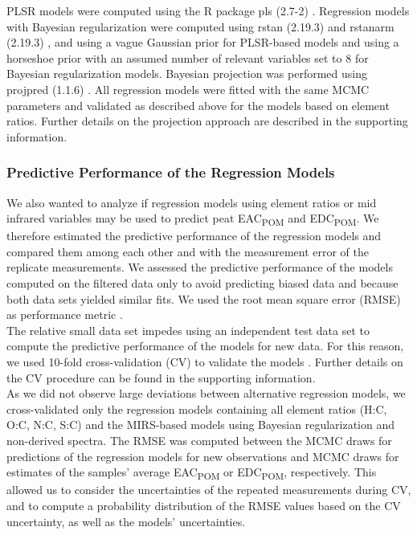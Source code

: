 \documentclass[alpha-refs]{wiley-article-rmd}
\begin{document}
\begin{refsection}
PLSR models were computed using the R package pls (2.7-2) \autocite{Mevik.2019}. Regression models with Bayesian regularization were computed using rstan (2.19.3) \autocite{StanDevelopmentTeam.2020} and rstanarm (2.19.3) \autocite{Goodrich.2020}, and using a vague Gaussian prior for PLSR-based models and using a horseshoe prior with an assumed number of relevant variables set to 8 \autocite{Piironen.2017c} for Bayesian regularization models. Bayesian projection was performed using projpred (1.1.6) \autocite{Piironen.2019}. All regression models were fitted with the same MCMC parameters and validated as described above for the models based on element ratios. Further details on the projection approach are described in the supporting information.

\hypertarget{predictive-performance-of-the-regression-models}{%
\subsubsection{Predictive Performance of the Regression Models}\label{predictive-performance-of-the-regression-models}}

We also wanted to analyze if regression models using element ratios or mid infrared variables may be used to predict peat EAC\textsubscript{POM} and EDC\textsubscript{POM}. We therefore estimated the predictive performance of the regression models and compared them among each other and with the measurement error of the replicate measurements. We assessed the predictive performance of the models computed on the filtered data only to avoid predicting biased data and because both data sets yielded similar fits. We used the root mean square error (RMSE) as performance metric \autocite{Bellocchi.2010}.\\
The relative small data set impedes using an independent test data set to compute the predictive performance of the models for new data. For this reason, we used 10-fold cross-validation (CV) to validate the models \autocite{Roberts.2017}. Further details on the CV procedure can be found in the supporting information.\\
As we did not observe large deviations between alternative regression models, we cross-validated only the regression models containing all element ratios (H:C, O:C, N:C, S:C) and the MIRS-based models using Bayesian regularization and non-derived spectra.
The RMSE was computed between the MCMC draws for predictions of the regression models for new observations and MCMC draws for estimates of the samples' average EAC\textsubscript{POM} or EDC\textsubscript{POM}, respectively. This allowed us to consider the uncertainties of the repeated measurements during CV, and to compute a probability distribution of the RMSE values based on the CV uncertainty, as well as the models' uncertainties.


\end{refsection}
\end{document}
